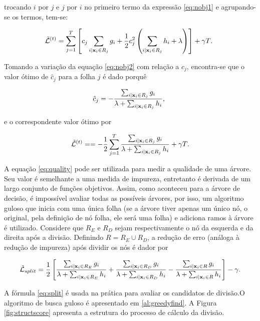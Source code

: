 trocando $i$ por $j$ e $j$ por $i$ no primeiro termo da expressão \eqref{eq:nobj1} e agrupando-se os termos, tem-se:

\begin{equation}\label{eq:nobj2}
\mathcal{\tilde{L}}^{(t)}=\sum_{j=1}^{T}\left[c_j\sum_{i|{\bf x}_i\in R_j}g_i+\frac{1}{2}c_j^2\left(\sum_{i|{\bf x}_i\in R_j}h_i+\lambda\right)\right]+\gamma{T}\mbox{.}~
\end{equation}

Tomando a variação da equação \eqref{eq:nobj2} com relação a $c_j$, encontra-se que o valor ótimo de  $\hat{c}_j$ para a folha $j$ é dado porquê

\begin{equation}
\hat{c}_j=-\frac{\sum_{i|{\bf x}_i\in R_j}g_i}{\lambda+\sum_{i|{\bf x}_i\in R_j}h_i}\mbox{,}~
\end{equation}

e o correspondente valor ótimo por

\begin{equation}\label{eq:quality}
\mathcal{\tilde{L}}^{(t)}==-\frac{1}{2}\sum_{j=1}^{T}\frac{\sum_{i|{\bf x}_i\in R_j}g_i}{\lambda+\sum_{i|{\bf x}_i\in R_j}h_i}+\gamma T\mbox{.}
\end{equation}

A equação \eqref{eq:quality} pode ser utilizada para medir a qualidade de uma árvore. Seu valor é semelhante a uma medida de impureza, entretanto é derivada de um largo conjunto de funções objetivos. Assim, como aconteceu para a árvore de decisão, é impossível avaliar todas as possíveis árvores, por isso, um algoritmo guloso que inicia com uma única folha (se a árvore tiver apenas um único nó, o original, pela definição de nó folha, ele será uma folha) e adiciona ramos à árvore é utilizado. Considere que $R_E$ e $R_D$ sejam respectivamente o nó da esquerda e da direita após a divisão. Definindo $R=R_E\cup R_D$, a redução de erro (análoga à redução de impureza) após dividir os nós é dador por

\begin{equation}\label{eq:split}
\mathcal{\tilde{L}}_{split}=\frac{1}{2}\left[\frac{\sum_{i|{\bf x}_i\in R_E}g_i}{\lambda+\sum_{i|{\bf x}_i\in R_E}h_i}+\frac{\sum_{i|{\bf x}_i\in R_D}g_i}{\lambda+\sum_{i|{\bf x}_i\in R_D}h_i}-\frac{\sum_{i|{\bf x}_i\in R}g_i}{\lambda+\sum_{i|{\bf x}_i\in R}h_i}\right]-\gamma\mbox{.}
\end{equation}

A fórmula \eqref{eq:split} é usada na prática para avaliar os candidatos de divisão.O algoritmo de busca guloso é apresentado em \ref{al:greedyfind}. A Figura \ref{fig:structscore} apresenta a estrutura do processo de cálculo da divisão.

